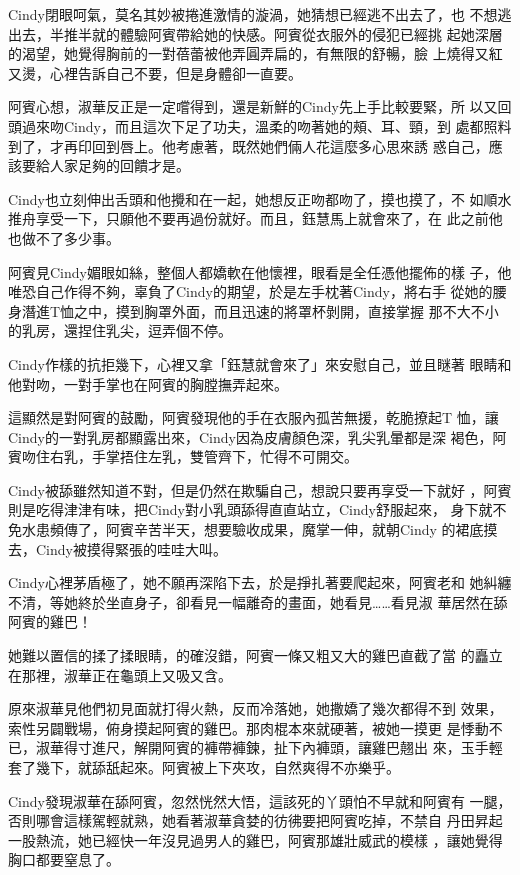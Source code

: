 Cindy閉眼呵氣，莫名其妙被捲進激情的漩渦，她猜想已經逃不出去了，也
不想逃出去，半推半就的體驗阿賓帶給她的快感。阿賓從衣服外的侵犯已經挑
起她深層的渴望，她覺得胸前的一對蓓蕾被他弄圓弄扁的，有無限的舒暢，臉
上燒得又紅又燙，心裡告訴自己不要，但是身體卻一直要。

阿賓心想，淑華反正是一定嚐得到，還是新鮮的Cindy先上手比較要緊，所
以又回頭過來吻Cindy，而且這次下足了功夫，溫柔的吻著她的頰、耳、頸，到
處都照料到了，才再印回到唇上。他考慮著，既然她們倆人花這麼多心思來誘
惑自己，應該要給人家足夠的回饋才是。

Cindy也立刻伸出舌頭和他攪和在一起，她想反正吻都吻了，摸也摸了，不
如順水推舟享受一下，只願他不要再過份就好。而且，鈺慧馬上就會來了，在
此之前他也做不了多少事。

阿賓見Cindy媚眼如絲，整個人都嬌軟在他懷裡，眼看是全任憑他擺佈的樣
子，他唯恐自己作得不夠，辜負了Cindy的期望，於是左手枕著Cindy，將右手
從她的腰身潛進T恤之中，摸到胸罩外面，而且迅速的將罩杯剝開，直接掌握
那不大不小的乳房，還捏住乳尖，逗弄個不停。

Cindy作樣的抗拒幾下，心裡又拿「鈺慧就會來了」來安慰自己，並且瞇著
眼睛和他對吻，一對手掌也在阿賓的胸膛撫弄起來。

這顯然是對阿賓的鼓勵，阿賓發現他的手在衣服內孤苦無援，乾脆撩起T
恤，讓Cindy的一對乳房都顯露出來，Cindy因為皮膚顏色深，乳尖乳暈都是深
褐色，阿賓吻住右乳，手掌捂住左乳，雙管齊下，忙得不可開交。

Cindy被舔雖然知道不對，但是仍然在欺騙自己，想說只要再享受一下就好
，阿賓則是吃得津津有味，把Cindy對小乳頭舔得直直站立，Cindy舒服起來，
身下就不免水患頻傳了，阿賓辛苦半天，想要驗收成果，魔掌一伸，就朝Cindy
的裙底摸去，Cindy被摸得緊張的哇哇大叫。

Cindy心裡茅盾極了，她不願再深陷下去，於是掙扎著要爬起來，阿賓老和
她糾纏不清，等她終於坐直身子，卻看見一幅離奇的畫面，她看見……看見淑
華居然在舔阿賓的雞巴！

她難以置信的揉了揉眼睛，的確沒錯，阿賓一條又粗又大的雞巴直截了當
的矗立在那裡，淑華正在龜頭上又吸又含。

原來淑華見他們初見面就打得火熱，反而冷落她，她撒嬌了幾次都得不到
效果，索性另闢戰場，俯身摸起阿賓的雞巴。那肉棍本來就硬著，被她一摸更
是悸動不已，淑華得寸進尺，解開阿賓的褲帶褲鍊，扯下內褲頭，讓雞巴翹出
來，玉手輕套了幾下，就舔舐起來。阿賓被上下夾攻，自然爽得不亦樂乎。

Cindy發現淑華在舔阿賓，忽然恍然大悟，這該死的丫頭怕不早就和阿賓有
一腿，否則哪會這樣駕輕就熟，她看著淑華貪婪的彷彿要把阿賓吃掉，不禁自
丹田昇起一股熱流，她已經快一年沒見過男人的雞巴，阿賓那雄壯威武的模樣
，讓她覺得胸口都要窒息了。

